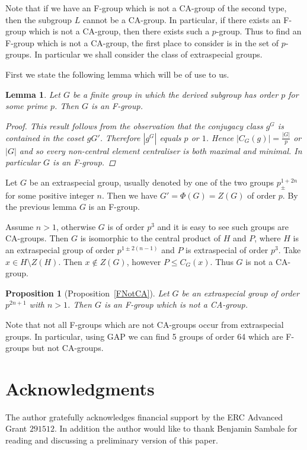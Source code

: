 \documentclass[a4paper,11pt]{article}
\theoremstyle{plain}
\newtheorem{lm}[thm]{Lemma}
\newtheorem*{prop*}{Proposition}
\numberwithin{thm}{section}
\begin{document}
Note that if we have an F-group which is not a CA-group of the second type, then the subgroup $L$ cannot be a CA-group.
In particular, if there exists an F-group which is not a CA-group, then there exists such a $p$-group.
Thus to find an F-group which is not a CA-group, the first place to consider is in the set of $p$-groups.
In particular we shall consider the class of extraspecial groups.

First we state the following lemma which will be of use to us.
\begin{lm}
Let $G$ be a finite group in which the derived subgroup has order $p$ for some prime $p$.
Then $G$ is an F-group.
\begin{proof}
This result follows from the observation that the conjugacy class $g^G$ is contained in the coset $gG'$.
Therefore $|g^G|$ equals $p$ or $1$.
Hence $|C_G(g)|=\frac{|G|}{p}$ or $|G|$ and so every non-central element centraliser is both maximal and minimal.
In particular $G$ is an F-group.
\end{proof}
\end{lm}

Let $G$ be an extraspecial group, usually denoted by one of the two groups $p^{1+2n}_{\pm}$ for some positive integer $n$.
Then we have $G'=\Phi(G)=Z(G)$ of order $p$.
By the previous lemma $G$ is an F-group.

Assume $n>1$, otherwise $G$ is of order $p^3$ and it is easy to see such groups are CA-groups.
Then $G$ is isomorphic to the central product of $H$ and $P$, where $H$ is an extraspecial group of order $p^{1\pm 2(n-1)}$ and $P$ is extraspecial of order $p^3$.
Take $x\in H\setminus Z(H)$.
Then $x\not\in Z(G)$, however $P\leq C_G(x)$.
Thus $G$ is not a CA-group.

\begin{prop*}[Proposition~\ref{FNotCA}]
Let $G$ be an extraspecial group of order $p^{2n+1}$ with $n>1$.
Then $G$ is an F-group which is not a CA-group.
\end{prop*}

Note that not all F-groups which are not CA-groups occur from extraspecial groups.
In particular, using GAP we can find 5 groups of order 64 which are F-groups but not CA-groups.

\section*{Acknowledgments}
The author gratefully acknowledges financial support by the ERC Advanced Grant $291512$.
In addition the author would like to thank Benjamin Sambale for reading and discussing a preliminary version of this paper.



\end{document}

